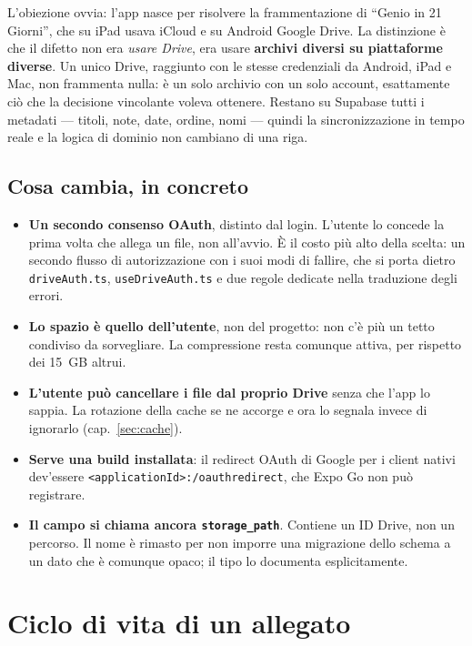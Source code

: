 \documentclass[11pt,a4paper]{report}
\begin{document}
L'obiezione ovvia: l'app nasce per risolvere la frammentazione di ``Genio in
21 Giorni'', che su iPad usava iCloud e su Android Google Drive. La
distinzione \`e che il difetto non era \emph{usare Drive}, era usare
\textbf{archivi diversi su piattaforme diverse}. Un unico Drive, raggiunto con
le stesse credenziali da Android, iPad e Mac, non frammenta nulla: \`e un solo
archivio con un solo account, esattamente ci\`o che la decisione vincolante
voleva ottenere. Restano su Supabase tutti i metadati --- titoli, note, date,
ordine, nomi --- quindi la sincronizzazione in tempo reale e la logica di
dominio non cambiano di una riga.

\section{Cosa cambia, in concreto}

\begin{itemize}[nosep]
  \item \textbf{Un secondo consenso OAuth}, distinto dal login. L'utente lo
        concede la prima volta che allega un file, non all'avvio. \`E il costo
        pi\`u alto della scelta: un secondo flusso di autorizzazione con i
        suoi modi di fallire, che si porta dietro \texttt{driveAuth.ts},
        \texttt{useDriveAuth.ts} e due regole dedicate nella traduzione degli
        errori.
  \item \textbf{Lo spazio \`e quello dell'utente}, non del progetto: non c'\`e
        pi\`u un tetto condiviso da sorvegliare. La compressione resta comunque
        attiva, per rispetto dei 15~GB altrui.
  \item \textbf{L'utente pu\`o cancellare i file dal proprio Drive} senza che
        l'app lo sappia. La rotazione della cache se ne accorge e ora lo
        segnala invece di ignorarlo (cap.~\ref{sec:cache}).
  \item \textbf{Serve una build installata}: il redirect OAuth di Google per i
        client nativi dev'essere \texttt{<applicationId>:/oauthredirect}, che
        Expo Go non pu\`o registrare.
  \item \textbf{Il campo si chiama ancora \texttt{storage\_path}}. Contiene un
        ID Drive, non un percorso. Il nome \`e rimasto per non imporre una
        migrazione dello schema a un dato che \`e comunque opaco; il tipo lo
        documenta esplicitamente.
\end{itemize}

\chapter{Ciclo di vita di un allegato}
\end{document}
